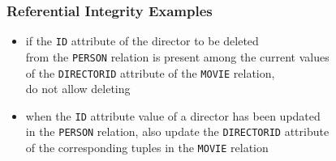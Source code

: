 \documentclass[dvipsnames]{beamer}
\theoremstyle{plain}
\begin{document}
\begin{frame}[fragile]
  \frametitle{Referential Integrity Examples}

  \begin{example}
    \begin{itemize}
      \item if the \texttt{ID} attribute of the director to be deleted\\
        from the \texttt{PERSON} relation is present among the current values\\
        of the \texttt{DIRECTORID} attribute of the \texttt{MOVIE} relation,\\
        do not allow deleting
    \end{itemize}
  \end{example}

  \pause
  \begin{example}
    \begin{itemize}
      \item when the \texttt{ID} attribute value of a director has been
        updated\\
        in the \texttt{PERSON} relation, also update the \texttt{DIRECTORID}
        attribute\\
        of the corresponding tuples in the \texttt{MOVIE} relation
    \end{itemize}
  \end{example}
\end{frame}
\end{document}
